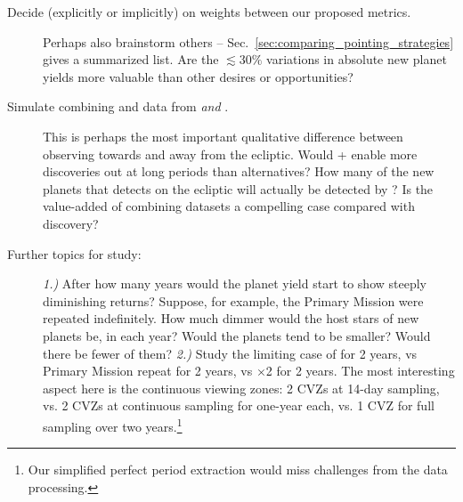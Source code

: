 \begin{description}
	\item[Decide (explicitly or implicitly) on weights between our
          proposed metrics.]  Perhaps also brainstorm others --
          Sec.~\ref{sec:comparing_pointing_strategies} gives a
          summarized list.  Are the $\lesssim30\%$ variations in
          absolute new planet yields more valuable than other desires
          or opportunities?
	
	\item[Simulate combining \tess and \ktwo data from
          \rm{\elong\:} \textit{and} \rm{\eshort}.]  This is perhaps
          the most important qualitative difference between observing
          towards and away from the ecliptic.  Would \tess\!+\ktwo
          enable more discoveries out at long periods than
          alternatives?  How many of the new planets that \tess
          detects on the ecliptic will actually be detected by \ktwo?
          Is the value-added of combining datasets a compelling case
          compared with discovery?
	
	\item[Further topics for study:]
	\textit{1.)}
	After how many years would the planet yield start to show steeply diminishing returns?
	Suppose, for example, the Primary Mission were repeated indefinitely.
  How much dimmer would the host stars of new planets be, in each year?
	Would the planets tend to be smaller?
	Would there be fewer of them?
	\textit{2.)}
	Study the limiting case of \hemis\:for 2 years, vs Primary Mission repeat for 2 years, vs \npole$\times$2 for 2 years. The most interesting aspect here is the continuous viewing zones: 2 CVZs at 14-day sampling, vs. 2 CVZs at continuous sampling for one-year each, vs. 1 CVZ for full sampling over two years.\footnote{Our simplified perfect period extraction would miss challenges from the data processing.}
\end{description}
